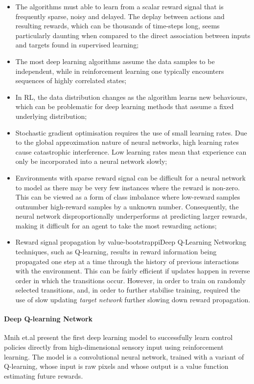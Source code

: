 \documentclass[12pt,a4paper]{article}
\begin{document}
\begin{itemize}
	\item The algorithms must able to learn from a scalar reward signal that is frequently sparse, noisy and delayed. The deplay between actions and resulting rewards, which can be thousands of time-steps long, seems particularly daunting when compared to the direct association between inputs and targets found in supervised learning;
	\item The most deep learning algorithms assume the data samples to be independent, while in reinforcement learning one typically encounters sequences of highly correlated states;
	\item In RL, the data distribution changes as the algorithm learns new behaviours, which can be problematic for deep learning methods that assume a fixed underlying distribution;
	\item Stochastic gradient optimisation requires the use of small learning rates. Due to the global approximation nature of neural networks, high learning rates cause catastrophic interference. Low learning rates mean that experience can only be incorporated into a neural network slowly;
	\item Environments with sparse reward signal can be difficult for a neural network to model as there may be very few instances where the reward is non-zero. This can be viewed as a form of class imbalance where low-reward samples outnumber high-reward samples by a unknown number. Consequently, the neural network disproportionally underperforms at predicting larger rewards, making it difficult for an agent to take the most rewarding actions;
	\item Reward signal propagation by value-bootstrappiDeep Q-Learning Networkng techniques, such as Q-learning, results in reward information being propagated one step at a time through the history of previous interactions with the environment. This can be fairly efficient if updates happen in reverse order in which the transitions occur. However, in order to train on randomly selected transitions, and, in order to further stabilise training, required the use of slow updating \textit{target network} further slowing down reward propagation.
\end{itemize} 
\paragraph{Deep Q-learning Network}  Mnih et.al present the first deep learning model to successfully learn control policies directly from high-dimensional sensory input using reinforcement learning.\cite{silver2016mastering} The model is a convolutional neural network, trained with a variant of Q-learning, whose input is raw pixels and whose output is a value function estimating future rewards.
\end{document}
